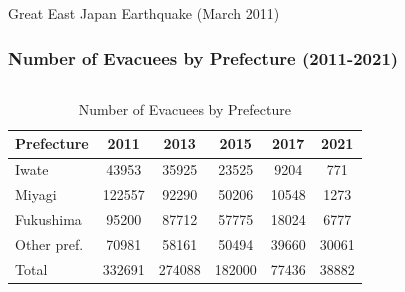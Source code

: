 \documentclass[serif, aspectratio=169]{beamer}
\begin{document}
\begin{frame}{Great East Japan Earthquake (March 2011)}
\begin{minipage}{1.00\textwidth}
\begin{flushleft}
\begin{table}[h!]
  \vspace{-1.95cm} %
\end{table}
\end{flushleft}
    \end{minipage}
    
\end{frame}


\begin{frame}[label=evacuees_main]
\frametitle{Number of Evacuees by Prefecture (2011-2021)}
    \vspace{-0.7cm}
    \begin{columns}[T, onlytextwidth]
        \begin{column}{0.5\textwidth}
            \begin{table}[ht]
                \scriptsize
                \setlength{\tabcolsep}{4pt}
                \renewcommand{\arraystretch}{1.0}
                \begin{tabular}{@{}lS[table-format=6.0]S[table-format=6.0]S[table-format=6.0]S[table-format=6.0]S[table-format=6.0]@{}}
                \toprule
                Prefecture & {2011} & {2013} & {2015} & {2017} & {2021} \\
                \midrule
                Iwate & 43953 & 35925 & 23525 & 9204 & 771 \\
                Miyagi & 122557 & 92290 & 50206 & 10548 & 1273 \\
                Fukushima & 95200 & 87712 & 57775 & 18024 & 6777 \\
                Other pref. & 70981 & 58161 & 50494 & 39660 & 30061 \\
                \midrule
                Total & 332691 & 274088 & 182000 & 77436 & 38882 \\
                \bottomrule
                \end{tabular}
                \caption{Number of Evacuees by Prefecture}
                \label{tab:evacuees}
            \end{table}
        \end{column}
        

\end{columns}
\end{frame}
\end{document}
